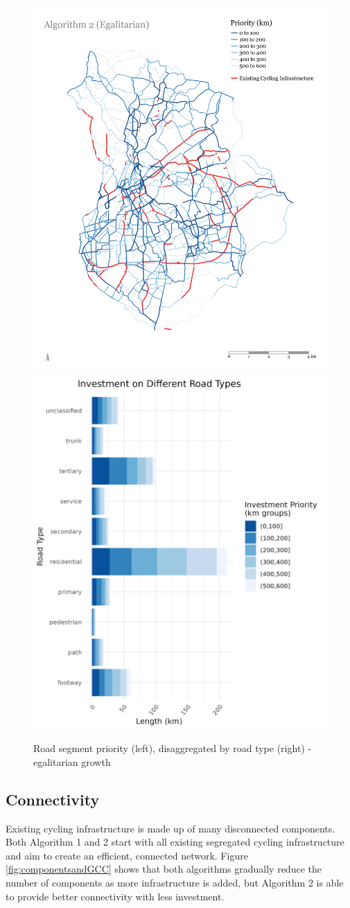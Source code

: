 \documentclass[
]{article}
\begin{document}
\begin{figure}

{\centering \includegraphics[width=0.45\linewidth]{data/Manchester/Plots/Growth_Results/growth_egalitarian_priority_all_FLOW} \includegraphics[width=0.45\linewidth]{data/Manchester/Plots/Growth_Results/growth_egalitarian_investment_highways_flow} 

}

\caption{Road segment priority (left), disaggregated by road type (right) - egalitarian growth}\label{fig:growth3MapandBar}
\end{figure}

\hypertarget{connectivity}{%
\subsection{Connectivity}\label{connectivity}}

Existing cycling infrastructure is made up of many disconnected
components. Both Algorithm 1 and 2 start with all existing segregated
cycling infrastructure and aim to create an efficient, connected
network. Figure \ref{fig:componentsandGCC} shows that both algorithms
gradually reduce the number of components as more infrastructure is
added, but Algorithm 2 is able to provide better connectivity with less
investment.
\end{document}
